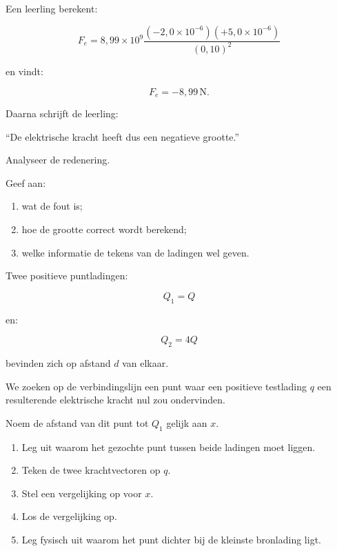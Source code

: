 \documentclass{ximera}
\begin{document}
\begin{oefening}{\oefU\ESS}

Een leerling berekent:

\[
F_e
=
8{,}99\times10^9
\frac{
(-2{,}0\times10^{-6})
(+5{,}0\times10^{-6})
}{
(0{,}10)^2
}
\]

en vindt:

\[
F_e=-8{,}99\,\mathrm N.
\]

Daarna schrijft de leerling:

``De elektrische kracht heeft dus een negatieve grootte.''

Analyseer de redenering.

Geef aan:

\begin{enumerate}
  \item wat de fout is;
  \item hoe de grootte correct wordt berekend;
  \item welke informatie de tekens van de ladingen wel geven.
\end{enumerate}

\end{oefening}





\begin{oefening}{\oefG}

Twee positieve puntladingen:

\[
Q_1=Q
\]

en:

\[
Q_2=4Q
\]

bevinden zich op afstand $d$ van elkaar.

We zoeken op de verbindingslijn een punt waar een positieve
testlading $q$ een resulterende elektrische kracht nul zou
ondervinden.

Noem de afstand van dit punt tot $Q_1$ gelijk aan $x$.

\begin{enumerate}
  \item Leg uit waarom het gezochte punt tussen beide ladingen moet
        liggen.
  \item Teken de twee krachtvectoren op $q$.
  \item Stel een vergelijking op voor $x$.
  \item Los de vergelijking op.
  \item Leg fysisch uit waarom het punt dichter bij de kleinste
        bronlading ligt.
\end{enumerate}

\end{oefening}
\end{document}
